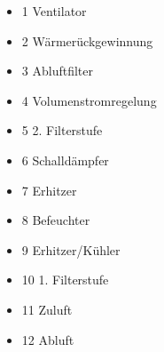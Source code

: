 \begin{itemize}
    \item 1 Ventilator
    \item 2 Wärmerückgewinnung
    \item 3 Abluftfilter
    \item 4 Volumenstromregelung
    \item 5 2. Filterstufe
    \item 6 Schalldämpfer
    \item 7 Erhitzer
    \item 8 Befeuchter
    \item 9 Erhitzer/Kühler
    \item 10 1. Filterstufe
    \item 11 Zuluft
    \item 12 Abluft
\end{itemize}




